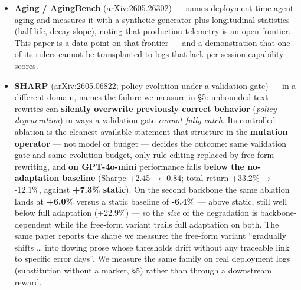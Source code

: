\documentclass[
]{article}
\begin{document}
\begin{itemize}
  wording.
\item
  \textbf{Aging / AgingBench} (arXiv:2605.26302) --- names
  deployment-time agent aging and measures it with a synthetic generator
  plus longitudinal statistics (half-life, decay slope), noting that
  production telemetry is an open frontier. This paper is a data point
  on that frontier --- and a demonstration that one of its rulers cannot
  be transplanted to logs that lack per-session capability scores.
\item
  \textbf{SHARP} (arXiv:2605.06822; policy evolution under a validation
  gate) --- in a different domain, names the failure we measure in §5:
  unbounded text rewrites can \textbf{silently overwrite previously
  correct behavior} (\emph{policy degeneration}) in ways a validation
  gate \emph{cannot fully catch}. Its controlled ablation is the
  cleanest available statement that structure in the \textbf{mutation
  operator} --- not model or budget --- decides the outcome: same
  validation gate and same evolution budget, only rule-editing replaced
  by free-form rewriting, and \textbf{on GPT-4o-mini} performance falls
  \textbf{below the no-adaptation baseline} (Sharpe +2.45 → -0.84; total
  return +33.2\% → -12.1\%, against \textbf{+7.3\% static}). On the
  second backbone the same ablation lands at \textbf{+6.0\%} versus a
  static baseline of \textbf{-6.4\%} --- above static, still well below
  full adaptation (+22.9\%) --- so the \emph{size} of the degradation is
  backbone-dependent while the free-form variant trails full adaptation
  on both. The same paper reports the shape we measure: the free-form
  variant ``gradually shifts \ldots{} into flowing prose whose
  thresholds drift without any traceable link to specific error days''.
  We measure the same family on real deployment logs (substitution
  without a marker, §5) rather than through a downstream reward.
\end{itemize}
\end{document}
